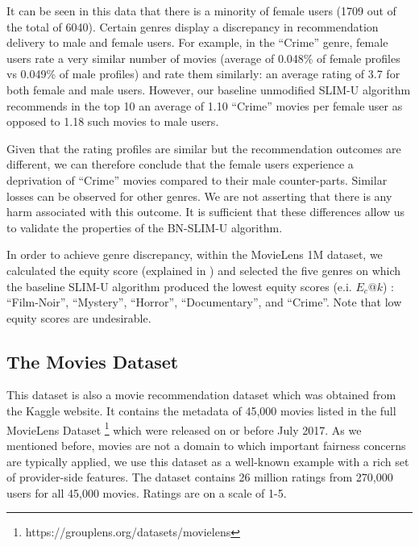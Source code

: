         It can be seen in this data that there is a minority of female users (1709 out of the total of 6040). Certain genres display a discrepancy in recommendation delivery to male and female users. For example, in the ``Crime'' genre, female users rate a very similar number of movies (average of 0.048\% of female profiles vs 0.049\% of male profiles) and rate them similarly: an average rating of 3.7 for both female and male users. However, our baseline unmodified SLIM-U algorithm recommends in the top 10 an average of 1.10 ``Crime'' movies per female user as opposed to 1.18 such movies to male users. 
        
        Given that the rating profiles are similar but the recommendation outcomes are different, we can therefore conclude that the female users experience a deprivation of ``Crime'' movies compared to their male counter-parts. Similar losses can be observed for other genres. We are not asserting that there is any harm associated with this outcome. It is sufficient that these differences allow us to validate the properties of the BN-SLIM-U algorithm.
        
        In order to achieve genre discrepancy, within the MovieLens 1M dataset, we calculated the equity score (explained in ) and selected the five genres on which the baseline SLIM-U algorithm produced the lowest equity scores (e.i. $E_c@k$) : ``Film-Noir'', ``Mystery'', ``Horror'', ``Documentary'', and ``Crime''. Note that low equity scores are undesirable.
        



    \subsection{The Movies Dataset}
    
    This dataset is also a movie recommendation dataset which was obtained from the Kaggle website. It contains the metadata of 45,000 movies listed in the full MovieLens Dataset \footnote{https://grouplens.org/datasets/movielens} which were released on or before July 2017. As we mentioned before, movies are not a domain to which important fairness concerns are typically applied, we use this dataset as a well-known example with a rich set of provider-side features. The dataset contains 26 million ratings from 270,000 users for all 45,000 movies. Ratings are on a scale of 1-5.
    
